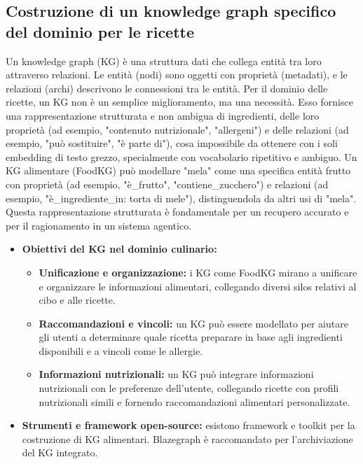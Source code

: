 \documentclass[a4paper, 11pt]{article}
\begin{document}
\subsection{Costruzione di un knowledge graph specifico del dominio per le ricette}
Un knowledge graph (KG) è una struttura dati che collega entità tra loro attraverso relazioni. \cite{understanding_kg} Le entità (nodi) sono oggetti con proprietà (metadati), e le relazioni (archi) descrivono le connessioni tra le entità. \cite{understanding_kg} Per il dominio delle ricette, un KG non è un semplice miglioramento, ma una necessità. Esso fornisce una rappresentazione strutturata e non ambigua di ingredienti, delle loro proprietà (ad esempio, "contenuto nutrizionale", "allergeni") e delle relazioni (ad esempio, "può sostituire", "è parte di"), cosa impossibile da ottenere con i soli embedding di testo grezzo, specialmente con vocabolario ripetitivo e ambiguo. Un KG alimentare (FoodKG) può modellare "mela" come una specifica entità frutto con proprietà (ad esempio, "è\_frutto", "contiene\_zucchero") e relazioni (ad esempio, "è\_ingrediente\_in: torta di mele"), distinguendola da altri usi di "mela". Questa rappresentazione strutturata \cite{understanding_kg} è fondamentale per un recupero accurato e per il ragionamento in un sistema agentico.
\begin{itemize}
    \item \textbf{Obiettivi del KG nel dominio culinario:}
    \begin{itemize}
        \item \textbf{Unificazione e organizzazione:} i KG come FoodKG mirano a unificare e organizzare le informazioni alimentari, collegando diversi silos relativi al cibo e alle ricette. \cite{foodkg}
        \item \textbf{Raccomandazioni e vincoli:} un KG può essere modellato per aiutare gli utenti a determinare quale ricetta preparare in base agli ingredienti disponibili e a vincoli come le allergie. \cite{foodkg}
        \item \textbf{Informazioni nutrizionali:} un KG può integrare informazioni nutrizionali con le preferenze dell'utente, collegando ricette con profili nutrizionali simili e fornendo raccomandazioni alimentari personalizzate. \cite{nutrition_kg_recommendation}
    \end{itemize}
    \item \textbf{Strumenti e framework open-source:} esistono framework e toolkit per la costruzione di KG alimentari. \cite{foodkg} Blazegraph è raccomandato per l'archiviazione del KG integrato. \cite{foodkg}
\end{itemize}
\end{document}
